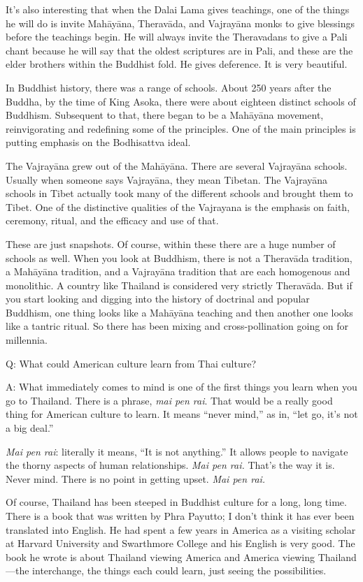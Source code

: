 It’s also interesting that when the Dalai Lama gives teachings, one of
the things he will do is invite Mahāyāna, Theravāda, and Vajrayāna monks
to give blessings before the teachings begin. He will always invite the
Theravadans to give a Pali chant because he will say that the oldest
scriptures are in Pali, and these are the elder brothers within the
Buddhist fold. He gives deference. It is very beautiful.

In Buddhist history, there was a range of schools. About 250 years after
the Buddha, by the time of King Asoka, there were about eighteen
distinct schools of Buddhism. Subsequent to that, there began to be a
Mahāyāna movement, reinvigorating and redefining some of the principles.
One of the main principles is putting emphasis on the Bodhisattva ideal.

The Vajrayāna grew out of the Mahāyāna. There are several Vajrayāna
schools. Usually when someone says Vajrayāna, they mean Tibetan. The
Vajrayāna schools in Tibet actually took many of the different schools
and brought them to Tibet. One of the distinctive qualities of the
Vajrayana is the emphasis on faith, ceremony, ritual, and the efficacy
and use of that.

These are just snapshots. Of course, within these there are a huge
number of schools as well. When you look at Buddhism, there is not a
Theravāda tradition, a Mahāyāna tradition, and a Vajrayāna tradition
that are each homogenous and monolithic. A country like Thailand is
considered very strictly Theravāda. But if you start looking and digging
into the history of doctrinal and popular Buddhism, one thing looks like
a Mahāyāna teaching and then another one looks like a tantric ritual. So
there has been mixing and cross-pollination going on for millennia.

Q: What could American culture learn from Thai culture?

A: What immediately comes to mind is one of the first things you learn
when you go to Thailand. There is a phrase, \emph{mai pen rai}. That
would be a really good thing for American culture to learn. It means
“never mind,” as in, “let go, it’s not a big deal.”

\emph{Mai pen rai}: literally it means, “It is not anything.” It allows
people to navigate the thorny aspects of human relationships. \emph{Mai
pen rai.} That’s the way it is. Never mind. There is no point in getting
upset. \emph{Mai pen rai.}

Of course, Thailand has been steeped in Buddhist culture for a long,
long time. There is a book that was written by Phra Payutto; I don’t
think it has ever been translated into English. He had spent a few years
in America as a visiting scholar at Harvard University and Swarthmore
College and his English is very good. The book he wrote is about
Thailand viewing America and America viewing Thailand—the interchange,
the things each could learn, just seeing the possibilities.

